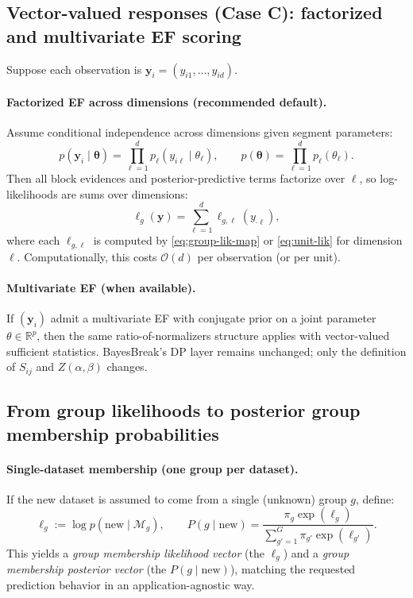 \subsection{Vector-valued responses (Case C): factorized and multivariate EF scoring}
\label{sec:prediction-multivariate-response}

Suppose each observation is $\mathbf{y}_i=(y_{i1},\dots,y_{id})$.

\paragraph{Factorized EF across dimensions (recommended default).}
Assume conditional independence across dimensions given segment parameters:
\[
p(\mathbf{y}_i\mid \boldsymbol{\theta})
=\prod_{\ell=1}^d p_\ell(y_{i\ell}\mid \theta_\ell),
\qquad
p(\boldsymbol{\theta})=\prod_{\ell=1}^d p_\ell(\theta_\ell).
\]
Then all block evidences and posterior-predictive terms factorize over $\ell$, so
log-likelihoods are sums over dimensions:
\[
\ell_g(\mathbf{y})=\sum_{\ell=1}^d \ell_{g,\ell}(y_{\cdot\ell}),
\]
where each $\ell_{g,\ell}$ is computed by \eqref{eq:group-lik-map} or \eqref{eq:unit-lik} for
dimension $\ell$. Computationally, this costs $\mathcal{O}(d)$ per observation (or per unit).

\paragraph{Multivariate EF (when available).}
If $(\mathbf{y}_i)$ admit a multivariate EF with conjugate prior on a joint parameter
$\theta\in\mathbb{R}^p$, then the same ratio-of-normalizers structure applies with vector-valued
sufficient statistics. BayesBreak's DP layer remains unchanged; only the definition of $S_{ij}$
and $Z(\alpha,\beta)$ changes.

\subsection{From group likelihoods to posterior group membership probabilities}
\label{sec:group-posterior}

\paragraph{Single-dataset membership (one group per dataset).}
If the new dataset is assumed to come from a single (unknown) group $g$, define:
\[
\ell_g := \log p(\text{new}\mid \mathcal{M}_g),
\qquad
P(g\mid \text{new})
= \frac{\pi_g\exp(\ell_g)}{\sum_{g'=1}^G \pi_{g'}\exp(\ell_{g'})}.
\]
This yields a \emph{group membership likelihood vector} (the $\ell_g$) and a
\emph{group membership posterior vector} (the $P(g\mid\text{new})$), matching the requested
prediction behavior in an application-agnostic way.

